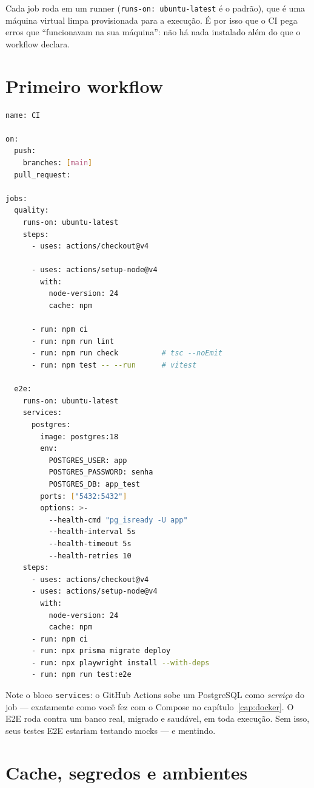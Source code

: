 Cada job roda em um runner (\texttt{runs-on: ubuntu-latest} é o padrão), que é
uma máquina virtual limpa provisionada para a execução. É por isso que o CI
pega erros que ``funcionavam na sua máquina'': não há nada instalado além do
que o workflow declara.

\section{Primeiro workflow}

\begin{lstlisting}[style=livro, language=Bash,
  caption={.github/workflows/ci.yml — checagens a cada push/PR.},
  label={list:cicd-ci}]
name: CI

on:
  push:
    branches: [main]
  pull_request:

jobs:
  quality:
    runs-on: ubuntu-latest
    steps:
      - uses: actions/checkout@v4

      - uses: actions/setup-node@v4
        with:
          node-version: 24
          cache: npm

      - run: npm ci
      - run: npm run lint
      - run: npm run check          # tsc --noEmit
      - run: npm test -- --run      # vitest

  e2e:
    runs-on: ubuntu-latest
    services:
      postgres:
        image: postgres:18
        env:
          POSTGRES_USER: app
          POSTGRES_PASSWORD: senha
          POSTGRES_DB: app_test
        ports: ["5432:5432"]
        options: >-
          --health-cmd "pg_isready -U app"
          --health-interval 5s
          --health-timeout 5s
          --health-retries 10
    steps:
      - uses: actions/checkout@v4
      - uses: actions/setup-node@v4
        with:
          node-version: 24
          cache: npm
      - run: npm ci
      - run: npx prisma migrate deploy
      - run: npx playwright install --with-deps
      - run: npm run test:e2e
\end{lstlisting}

\begin{caixadica}
Note o bloco \texttt{services}: o GitHub Actions sobe um PostgreSQL como
\emph{serviço} do job — exatamente como você fez com o Compose no
capítulo~\ref{cap:docker}. O E2E roda contra um banco real, migrado e
saudável, em toda execução. Sem isso, seus testes E2E estariam testando
mocks — e mentindo.
\end{caixadica}

\section{Cache, segredos e ambientes}

